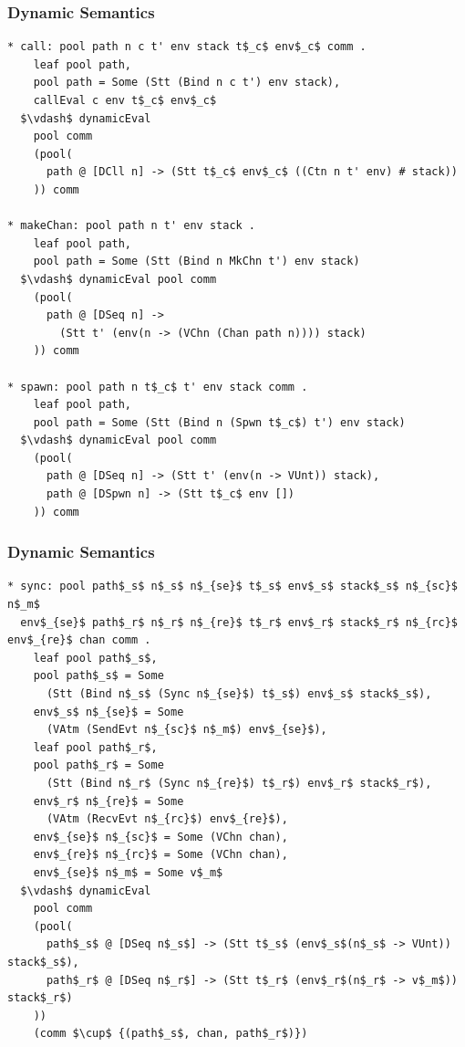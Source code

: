 \documentclass{beamer}
\begin{document}
\begin{frame}[fragile]
	\frametitle{Dynamic Semantics}
\begin{lstlisting}[language=logic, mathescape]
* call: pool path n c t' env stack t$_c$ env$_c$ comm .
    leaf pool path,
    pool path = Some (Stt (Bind n c t') env stack),
    callEval c env t$_c$ env$_c$
  $\vdash$ dynamicEval
    pool comm
    (pool(
      path @ [DCll n] -> (Stt t$_c$ env$_c$ ((Ctn n t' env) # stack))
    )) comm

* makeChan: pool path n t' env stack .
    leaf pool path,
    pool path = Some (Stt (Bind n MkChn t') env stack)
  $\vdash$ dynamicEval pool comm 
    (pool(
      path @ [DSeq n] ->
        (Stt t' (env(n -> (VChn (Chan path n)))) stack)
    )) comm

* spawn: pool path n t$_c$ t' env stack comm .
    leaf pool path, 
    pool path = Some (Stt (Bind n (Spwn t$_c$) t') env stack)
  $\vdash$ dynamicEval pool comm 
    (pool(
      path @ [DSeq n] -> (Stt t' (env(n -> VUnt)) stack),
      path @ [DSpwn n] -> (Stt t$_c$ env [])
    )) comm
\end{lstlisting}
\end{frame}

\begin{frame}[fragile]
	\frametitle{Dynamic Semantics}
\begin{lstlisting}[language=logic, mathescape]
* sync: pool path$_s$ n$_s$ n$_{se}$ t$_s$ env$_s$ stack$_s$ n$_{sc}$ n$_m$
  env$_{se}$ path$_r$ n$_r$ n$_{re}$ t$_r$ env$_r$ stack$_r$ n$_{rc}$ env$_{re}$ chan comm .
    leaf pool path$_s$,
    pool path$_s$ = Some
      (Stt (Bind n$_s$ (Sync n$_{se}$) t$_s$) env$_s$ stack$_s$),
    env$_s$ n$_{se}$ = Some
      (VAtm (SendEvt n$_{sc}$ n$_m$) env$_{se}$),
    leaf pool path$_r$,
    pool path$_r$ = Some
      (Stt (Bind n$_r$ (Sync n$_{re}$) t$_r$) env$_r$ stack$_r$),
    env$_r$ n$_{re}$ = Some
      (VAtm (RecvEvt n$_{rc}$) env$_{re}$),
    env$_{se}$ n$_{sc}$ = Some (VChn chan),
    env$_{re}$ n$_{rc}$ = Some (VChn chan), 
    env$_{se}$ n$_m$ = Some v$_m$
  $\vdash$ dynamicEval
    pool comm
    (pool(
      path$_s$ @ [DSeq n$_s$] -> (Stt t$_s$ (env$_s$(n$_s$ -> VUnt)) stack$_s$), 
      path$_r$ @ [DSeq n$_r$] -> (Stt t$_r$ (env$_r$(n$_r$ -> v$_m$)) stack$_r$)
    )) 
    (comm $\cup$ {(path$_s$, chan, path$_r$)})
\end{lstlisting}
\end{frame}
\end{document}
